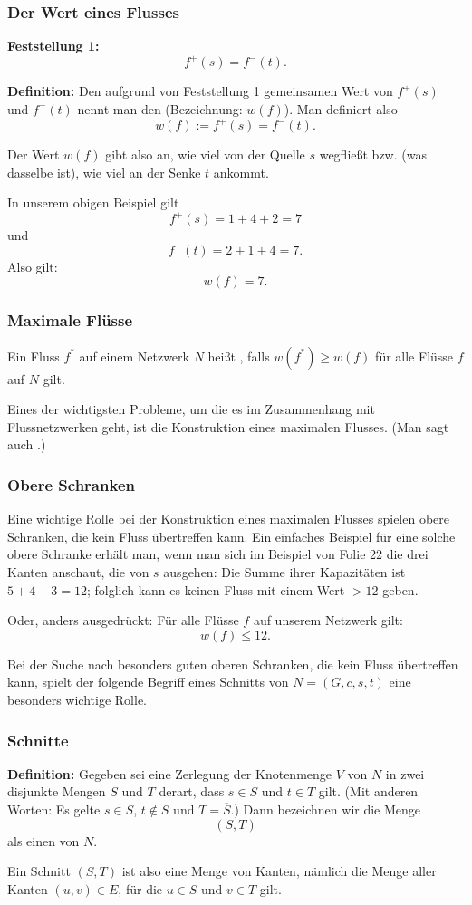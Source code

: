 \documentclass[smaller]{beamer}
\begin{document}
\begin{frame}
 \frametitle{Der Wert eines Flusses}
  \textbf{Feststellung 1:}
  \[
   f^+(s) = f^-(t).
  \]
  
 \textbf{Definition:}
 Den aufgrund von Feststellung 1 gemeinsamen Wert von $f^+(s)$ und $f^-(t)$ nennt man den  (Bezeichnung: $w(f)$). Man definiert also
 \[
  w(f) := f^+(s) = f^-(t).
 \]
 
 \alert{Der Wert $w(f)$ gibt also an, wie viel von der Quelle $s$ wegfließt bzw. (was dasselbe ist), wie viel an der Senke $t$ ankommt}. \\ \vspace*{0.2cm}

In unserem obigen Beispiel gilt
\[
f^+(s) = 1+4+2=7
\]
und
\[
f^-(t) = 2+1+4 = 7.
\]
Also gilt:
\[
w(f) = 7.
\]
\end{frame}

\begin{frame}
 \frametitle{Maximale Flüsse}
 Ein Fluss $f^*$ auf einem Netzwerk $N$ heißt , falls $w(f^*) \geq w(f)$ für alle Flüsse $f$ auf $N$ gilt. \\ \vspace*{0.2cm}

\alert{Eines der wichtigsten Probleme, um die es im Zusammenhang mit Flussnetzwerken geht, ist die Konstruktion eines maximalen Flusses}. (Man sagt auch .)
\end{frame}

\begin{frame}
 \frametitle{Obere Schranken}
 Eine wichtige Rolle bei der Konstruktion eines maximalen Flusses spielen \alert{obere Schranken}, die kein Fluss übertreffen kann. Ein einfaches Beispiel für eine solche obere Schranke erhält man, wenn man sich im Beispiel von Folie 22 die drei Kanten anschaut, die von $s$ ausgehen: Die Summe ihrer Kapazitäten ist $5+4+3=12$; folglich kann es keinen Fluss mit einem Wert $>12$ geben. \\ \vspace*{0.2cm}

Oder, anders ausgedrückt: Für alle Flüsse $f$ auf unserem Netzwerk gilt:
\[
w(f) \leq 12.
\]

Bei der Suche nach besonders guten oberen Schranken, die kein Fluss übertreffen kann, spielt der folgende Begriff eines Schnitts von $N=(G,c,s,t)$ eine besonders wichtige Rolle.
\end{frame}

\begin{frame}
 \frametitle{Schnitte}
 \textbf{Definition:} Gegeben sei eine Zerlegung der Knotenmenge $V$ von $N$ in zwei disjunkte Mengen $S$ und $T$ derart, dass $s\in S$ und $t \in T$ gilt. (Mit anderen Worten: Es gelte $s \in S$, $t \not\in S$ und $T = \overline{S}$.) Dann bezeichnen wir die Menge
\[
(S,T)
\]
als einen  von $N$. \\ \vspace*{0.2cm}

Ein Schnitt $(S,T)$ ist also eine Menge von Kanten, nämlich die Menge aller Kanten $(u,v) \in E$, für die $u \in S$ und $v \in T$ gilt.
\end{frame}
\end{document}
